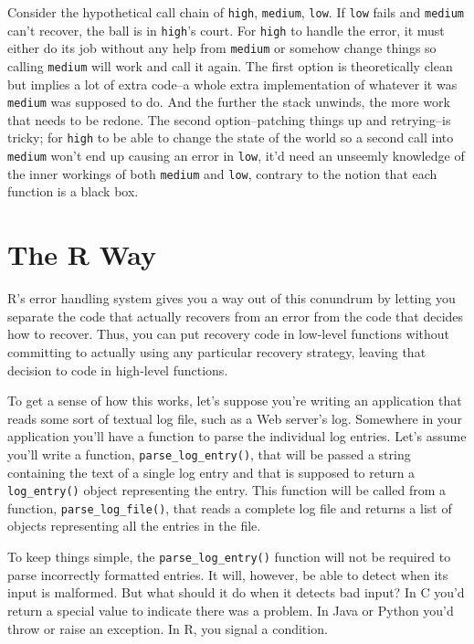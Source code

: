 Consider the hypothetical call chain of \texttt{high}, \texttt{medium},
\texttt{low}. If \texttt{low} fails and \texttt{medium} can't recover,
the ball is in \texttt{high}'s court. For \texttt{high} to handle the
error, it must either do its job without any help from \texttt{medium}
or somehow change things so calling \texttt{medium} will work and call
it again. The first option is theoretically clean but implies a lot of
extra code--a whole extra implementation of whatever it was
\texttt{medium} was supposed to do. And the further the stack unwinds,
the more work that needs to be redone. The second option--patching
things up and retrying--is tricky; for \texttt{high} to be able to
change the state of the world so a second call into \texttt{medium}
won't end up causing an error in \texttt{low}, it'd need an unseemly
knowledge of the inner workings of both \texttt{medium} and
\texttt{low}, contrary to the notion that each function is a black box.

\hypertarget{the-r-way}{%
\section{The R Way}\label{the-r-way}}

R's error handling system gives you a way out of this conundrum by
letting you separate the code that actually recovers from an error from
the code that decides how to recover. Thus, you can put recovery code in
low-level functions without committing to actually using any particular
recovery strategy, leaving that decision to code in high-level
functions.

To get a sense of how this works, let's suppose you're writing an
application that reads some sort of textual log file, such as a Web
server's log. Somewhere in your application you'll have a function to
parse the individual log entries. Let's assume you'll write a function,
\texttt{parse\_log\_entry()}, that will be passed a string containing
the text of a single log entry and that is supposed to return a
\texttt{log\_entry()} object representing the entry. This function will
be called from a function, \texttt{parse\_log\_file()}, that reads a
complete log file and returns a list of objects representing all the
entries in the file.

To keep things simple, the \texttt{parse\_log\_entry()} function will
not be required to parse incorrectly formatted entries. It will,
however, be able to detect when its input is malformed. But what should
it do when it detects bad input? In C you'd return a special value to
indicate there was a problem. In Java or Python you'd throw or raise an
exception. In R, you signal a condition.

